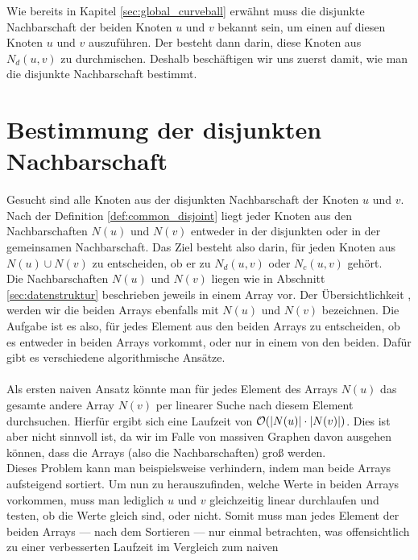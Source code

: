 Wie bereits in Kapitel \ref{sec:global_curveball} erwähnt muss die disjunkte Nachbarschaft
der beiden Knoten $u$ und $v$ bekannt sein, um einen \ct{} auf diesen Knoten $u$ und $v$
auszuführen. Der \ct{} besteht dann darin, diese Knoten aus $N_{d}(u,v)$ zu durchmischen.
Deshalb beschäftigen wir uns zuerst damit, wie man die disjunkte Nachbarschaft bestimmt.


\section{Bestimmung der disjunkten Nachbarschaft}
\label{sec:common}
Gesucht sind alle Knoten aus der disjunkten Nachbarschaft der Knoten $u$ und $v$.
Nach der Definition \ref{def:common_disjoint} liegt jeder Knoten aus den Nachbarschaften $N(u)$ und $N(v)$ 
entweder in der disjunkten oder in der gemeinsamen Nachbarschaft. Das Ziel besteht also darin, 
für jeden Knoten aus $N(u) \cup N(v)$ zu entscheiden, ob er zu $N_{d}(u,v)$ oder $N_{c}(u,v)$ gehört.
\\
Die Nachbarschaften $N(u)$ und $N(v)$ liegen wie in Abschnitt \ref{sec:datenstruktur} beschrieben jeweils
in einem Array vor. Der Übersichtlichkeit , werden wir die beiden
Arrays ebenfalls mit $N(u)$ und $N(v)$ bezeichnen. Die Aufgabe ist es also,
 für jedes Element aus den beiden Arrays zu entscheiden,
ob es entweder in beiden Arrays vorkommt, oder nur in einem von den beiden. Dafür 
gibt es verschiedene algorithmische Ansätze.
\\
\\
Als ersten naiven Ansatz könnte man für jedes Element des Arrays $N(u)$ das gesamte andere 
Array $N(v)$ per linearer Suche nach diesem Element durchsuchen. Hierfür ergibt sich eine Laufzeit von
$\mathcal{O}(|N(u)|\cdot|N(v)|)$. Dies ist aber nicht sinnvoll ist, da wir 
im Falle von massiven Graphen davon ausgehen können, dass die Arrays (also die Nachbarschaften)
 groß werden. 
\\
Dieses Problem kann man beispielsweise verhindern, indem man beide Arrays aufsteigend sortiert. 
Um nun zu herauszufinden,
welche Werte in beiden Arrays vorkommen, muss man lediglich $u$ und $v$ gleichzeitig linear durchlaufen
und testen, ob die Werte gleich sind, oder nicht. Somit muss man jedes 
Element der beiden Arrays --- nach dem Sortieren --- 
nur einmal betrachten, was offensichtlich zu einer verbesserten Laufzeit im Vergleich zum naiven
